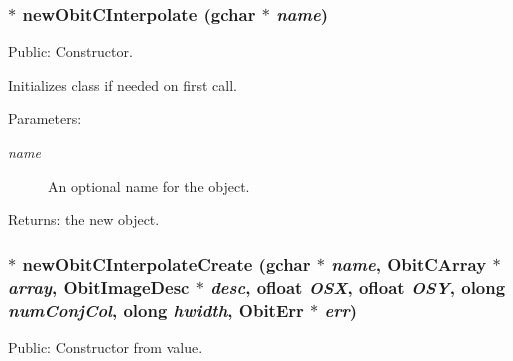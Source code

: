 \subsubsection{$\ast$ new\-Obit\-CInterpolate (gchar $\ast$ {\em name})}\label{ObitCInterpolate_8h_a4}


Public: Constructor. 

Initializes class if needed on first call. \begin{Desc}
\item[Parameters:]
\begin{description}
\item[{\em name}]An optional name for the object. \end{description}
\end{Desc}
\begin{Desc}
\item[Returns:]the new object. \end{Desc}
\subsubsection{$\ast$ new\-Obit\-CInterpolate\-Create (gchar $\ast$ {\em name}, {\bf Obit\-CArray} $\ast$ {\em array}, {\bf Obit\-Image\-Desc} $\ast$ {\em desc}, {\bf ofloat} {\em OSX}, {\bf ofloat} {\em OSY}, {\bf olong} {\em num\-Conj\-Col}, {\bf olong} {\em hwidth}, {\bf Obit\-Err} $\ast$ {\em err})}\label{ObitCInterpolate_8h_a5}


Public: Constructor from value. 


